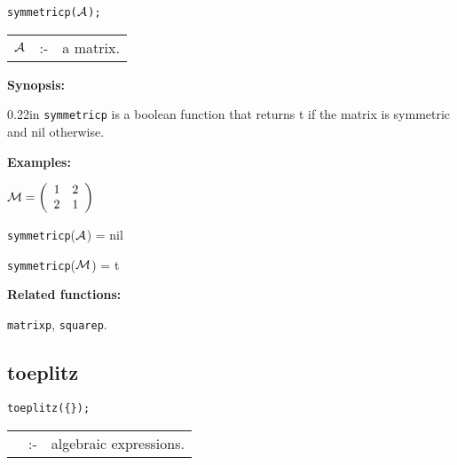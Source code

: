 
\hspace*{0.175in} {\tt symmetricp(${\cal A}$);}

\hspace*{0.1in}  
\begin{tabular}{l l l} 
${\cal A}$ &:-& a matrix. 
\end{tabular}

{\bf Synopsis:} %

\begin{addtolength}{\leftskip}{0.22in}
{\tt symmetricp} is a boolean function that returns t if the 
                matrix is symmetric and nil otherwise.

\end{addtolength}

{\bf Examples:}

\begin{flushleft}
\hspace*{0.175in}
\begin{math}  
{\cal M} = \left( \begin{array}{cc} 1 & 2 \\ 2 & 1 
\end{array} \right)
\end{math}  
\end{flushleft}

\vspace*{0.1in}

\hspace*{0.175in} {\tt symmetricp}(${\cal A}$) = nil 

\hspace*{0.175in} {\tt symmetricp}(${\cal M}$) = t

{\bf Related functions:}

\hspace*{0.175in} {\tt matrixp}, {\tt squarep}.


\subsection{toeplitz}


\hspace*{0.175in} {\tt toeplitz(\{\exprlist{}\});} \lazyfootnote{}

\hspace*{0.1in} 
\begin{tabular}{l l l}
\exprlist{} &:-& algebraic expressions.
\end{tabular}

